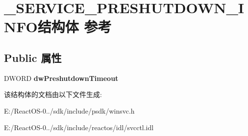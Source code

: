 \hypertarget{struct___s_e_r_v_i_c_e___p_r_e_s_h_u_t_d_o_w_n___i_n_f_o}{}\section{\+\_\+\+S\+E\+R\+V\+I\+C\+E\+\_\+\+P\+R\+E\+S\+H\+U\+T\+D\+O\+W\+N\+\_\+\+I\+N\+F\+O结构体 参考}
\label{struct___s_e_r_v_i_c_e___p_r_e_s_h_u_t_d_o_w_n___i_n_f_o}
\subsection*{Public 属性}
\begin{DoxyCompactItemize}
\item 
\mbox{\label{struct___s_e_r_v_i_c_e___p_r_e_s_h_u_t_d_o_w_n___i_n_f_o_a8de7139ebc774d342ac90bbafbf088e1}} 
D\+W\+O\+RD {\bfseries dw\+Preshutdown\+Timeout}
\end{DoxyCompactItemize}


该结构体的文档由以下文件生成\+:\begin{DoxyCompactItemize}
\item 
E\+:/\+React\+O\+S-\/0../sdk/include/psdk/winsvc.\+h\item 
E\+:/\+React\+O\+S-\/0../sdk/include/reactos/idl/svcctl.\+idl\end{DoxyCompactItemize}
